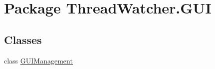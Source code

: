 \hypertarget{namespace_thread_watcher_1_1_g_u_i}{\section{Package Thread\+Watcher.\+G\+U\+I}
\label{namespace_thread_watcher_1_1_g_u_i}
}
\subsection*{Classes}
\begin{DoxyCompactItemize}
\item 
class \hyperlink{class_thread_watcher_1_1_g_u_i_1_1_g_u_i_management}{G\+U\+I\+Management}
\end{DoxyCompactItemize}
